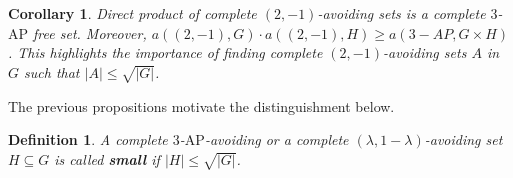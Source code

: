 \documentclass[11pt]{article}
\numberwithin{table}{section}
\newtheorem{corollary}[theorem]{Corollary}
\newtheorem{definition}[theorem]{Definition}
\theoremstyle{definition}
\begin{document}
	
	
	\begin{corollary}
		Direct product of complete $(2,-1)$-avoiding sets is a complete $3$-$\mathrm{AP}$ free set. Moreover,
		$  a((2,-1),G)\cdot a((2,-1),H) \ge a(3-AP,G\times H)$. This highlights the importance of finding complete $(2,-1)$-avoiding sets $A$ in $G$ such that  $|A|\leq \sqrt{|G|} $. 
	\end{corollary}
	
	
	
	The previous propositions %
	motivate the distinguishment below.
	
	\begin{definition}
		A complete $3$-$\mathrm{AP}$-avoiding or a complete $(\lambda, 1-\lambda)$-avoiding set $H\subseteq G$ is called \textbf{small} if $|H|\leq  \sqrt{|G|} $. 
	\end{definition}
	
\end{document}
